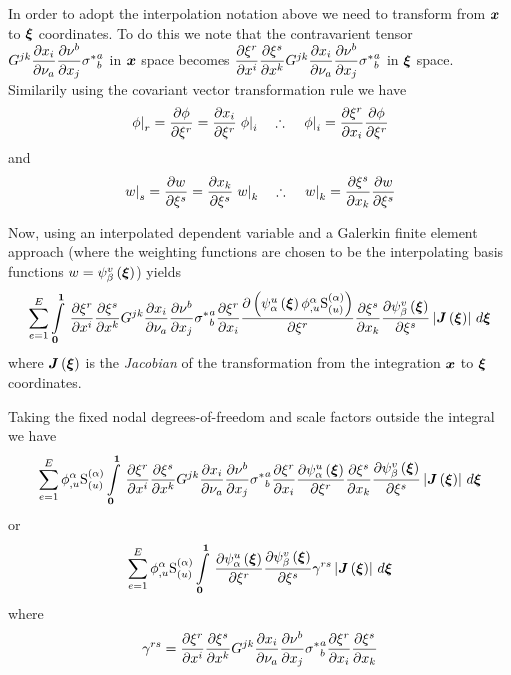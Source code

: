 In order to adopt the interpolation notation above we need to transform from
$\vect{x}$ to $\vect{\xi}$ coordinates. To do this we note that the
contravarient tensor
$G^{jk} \dfrac{\partial x_{i}}{\partial \nu_{a}}  \dfrac{\partial \nu^{b}}{\partial x_{j}} {\sigma^{*}}^{a}_{b}$ in
$\vect{x}$ space becomes
$ \dfrac{\partial \xi^{r}}{\partial x^{i}}  \dfrac{\partial \xi^{s}}{\partial x^{k}} G^{jk} \dfrac{\partial x_{i}}{\partial \nu_{a}}  \dfrac{\partial \nu^{b}}{\partial x_{j}} {\sigma^{*}}^{a}_{b}$
in $\vect{\xi}$ space. Similarily using the covariant vector transformation
rule we have
\begin{equation}
   \left. \phi \right|_{r} = \dfrac{\partial \phi}{\partial \xi^{r}} = \dfrac{\partial x_{i}}{\partial \xi^{r}}  \left. \phi \right|_{i} \quad\therefore\quad \left. \phi \right|_{i} = \dfrac{\partial \xi^{r}}{\partial x_{i}}  \dfrac{\partial \phi}{\partial \xi^{r}} 
\end{equation}
and
\begin{equation}
   \left. w \right|_{s} = \dfrac{\partial w}{\partial \xi^{s}} = \dfrac{\partial x_{k}}{\partial \xi^{s}}  \left. w \right|_{k} \quad\therefore\quad \left. w \right|_{k} = \dfrac{\partial \xi^{s}}{\partial x_{k}}  \dfrac{\partial w}{\partial \xi^{s}} 
\end{equation}

Now, using an interpolated dependent variable and a Galerkin finite element
approach (where the weighting functions are chosen to be the interpolating
basis functions \ie $w=\gbfn{\beta}{v}{\vect{\xi}}$) yields
\begin{equation}
  \dsum_{e=1}^{E}\gint{\vect{0}}{\vect{1}}{\delby{\xi^{r}}{x^{i}}\delby{\xi^{s}}{x^{k}}G^{jk}\delby{x_{i}}{\nu_{a}}\delby{\nu^{b}}{x_{j}}{\sigma^{*}}^{a}_{b}
    \delby{\xi^{r}}{x_{i}}\delby{\pbrac{\gbfn{\alpha}{u}{\vect{\xi}}\nodedof{\phi}{\alpha}{u}\gsf{(\alpha)}{(u)}}}{\xi^{r}}
    \delby{\xi^{s}}{x_{k}}\delby{\gbfn{\beta}{v}{\vect{\xi}}}{\xi^{s}}
    \abs{\fnof{\matr{J}}{\vect{\xi}}}}{\vect{\xi}}
\end{equation}
where $\fnof{\matr{J}}{\vect{\xi}}$ is the \emph{Jacobian} of the
transformation from the integration $\vect{x}$ to $\vect{\xi}$ coordinates.

Taking the fixed nodal degrees-of-freedom and scale factors outside the integral we have
\begin{equation}
  \dsum_{e=1}^{E}\nodedof{\phi}{\alpha}{u}\gsf{(\alpha)}{(u)}
  \gint{\vect{0}}{\vect{1}}{\delby{\xi^{r}}{x^{i}}\delby{\xi^{s}}{x^{k}}G^{jk}\delby{x_{i}}{\nu_{a}}\delby{\nu^{b}}{x_{j}}{\sigma^{*}}^{a}_{b}
    \delby{\xi^{r}}{x_{i}}\delby{\gbfn{\alpha}{u}{\vect{\xi}}}{\xi^{r}}
    \delby{\xi^{s}}{x_{k}}\delby{\gbfn{\beta}{v}{\vect{\xi}}}{\xi^{s}}
    \abs{\fnof{\matr{J}}{\vect{\xi}}}}{\vect{\xi}}
  \label{eqn:elementalfemlhs}
\end{equation}
or
\begin{equation}
  \dsum_{e=1}^{E}\nodedof{\phi}{\alpha}{u}\gsf{(\alpha)}{(u)}
  \gint{\vect{0}}{\vect{1}}{\delby{\gbfn{\alpha}{u}{\vect{\xi}}}{\xi^{r}}\delby{\gbfn{\beta}{v}{\vect{\xi}}}{\xi^{s}}\gamma^{rs}
    \abs{\fnof{\matr{J}}{\vect{\xi}}}}{\vect{\xi}}
  \label{eqn:elementalfemlhs}
\end{equation}
where
\begin{equation}
  \gamma^{rs}= \dfrac{\partial \xi^{r}}{\partial x^{i}}  \dfrac{\partial \xi^{s}}{\partial x^{k}} G^{jk} \dfrac{\partial x_{i}}{\partial \nu_{a}}  \dfrac{\partial \nu^{b}}{\partial x_{j}} {\sigma^{*}}^{a}_{b} \dfrac{\partial \xi^{r}}{\partial x_{i}}  \dfrac{\partial \xi^{s}}{\partial x_{k}} 
\end{equation}

